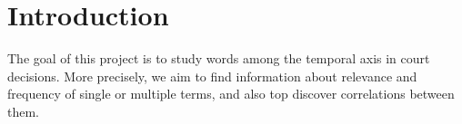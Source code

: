 \section{Introduction}

The goal of this project is to study words among the 
temporal axis in court decisions. 
More precisely, we aim to find information about relevance and 
frequency of single or multiple terms, and also top discover 
correlations between them. 